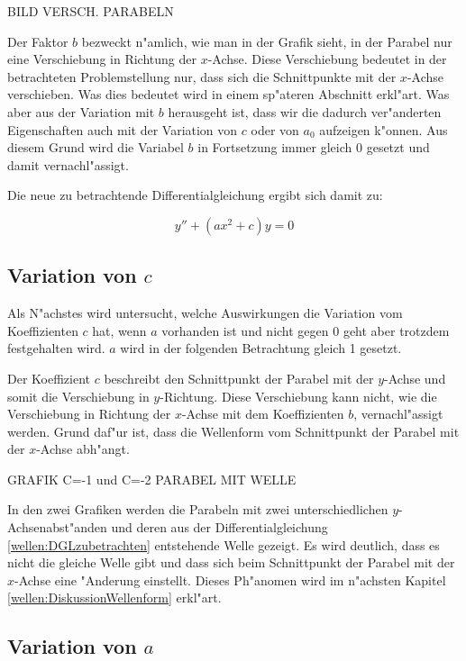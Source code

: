 \begin{refsection}
BILD VERSCH. PARABELN

Der Faktor $b$ bezweckt n"amlich, wie man in der Grafik sieht, in der Parabel 
nur eine Verschiebung in Richtung der $x$-Achse. Diese Verschiebung bedeutet in 
der betrachteten Problemstellung nur, dass sich die Schnittpunkte mit der 
$x$-Achse verschieben. Was dies bedeutet wird in einem sp"ateren Abschnitt 
erkl"art. Was aber aus der Variation mit $b$ herausgeht ist, dass wir die 
dadurch ver"anderten Eigenschaften auch mit der Variation von $c$ oder von 
$a_0$ aufzeigen k"onnen. Aus diesem Grund wird die Variabel $b$ in Fortsetzung 
immer gleich 0 gesetzt und damit vernachl"assigt. 

Die neue zu betrachtende Differentialgleichung ergibt sich damit zu:

\begin{equation} 
	y'' + (ax^2 +c)y = 0
	\label{wellen:DGLzubetrachten}
\end{equation}

\subsection{Variation von $c$}
\label{wellen:Variationc}

Als N"achstes wird untersucht, welche Auswirkungen die Variation vom 
Koeffizienten $c$ hat, wenn $a$ vorhanden ist und nicht gegen 0 geht aber 
trotzdem festgehalten wird. $a$ wird in der folgenden Betrachtung gleich 1 
gesetzt.

Der Koeffizient $c$ beschreibt den Schnittpunkt der Parabel mit der $y$-Achse 
und somit die Verschiebung in $y$-Richtung. Diese Verschiebung kann nicht, wie 
die Verschiebung in Richtung der $x$-Achse mit dem Koeffizienten $b$, 
vernachl"assigt werden. Grund daf"ur ist, dass die Wellenform vom Schnittpunkt 
der Parabel mit der $x$-Achse abh"angt. 

GRAFIK C=-1 und C=-2 PARABEL MIT WELLE

In den zwei Grafiken werden die 
Parabeln mit zwei unterschiedlichen $y$-Achsenabst"anden und deren aus der 
Differentialgleichung \ref{wellen:DGLzubetrachten} entstehende Welle gezeigt. 
Es wird deutlich, dass es nicht die gleiche Welle gibt und dass sich beim 
Schnittpunkt der Parabel mit der $x$-Achse eine "Anderung einstellt. Dieses 
Ph"anomen wird im n"achsten Kapitel \ref{wellen:DiskussionWellenform} erkl"art. 

\subsection{Variation von $a$}
\label{wellen:Variationa}


\end{refsection}
